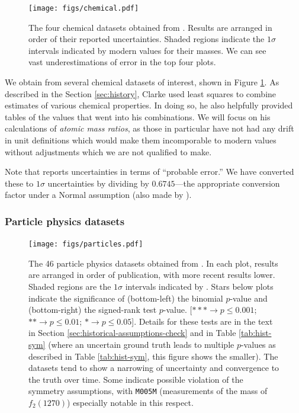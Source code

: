 \documentclass[letterpaper,12pt]{article}
\begin{document}
\begin{figure}[htbp]
  \texttt{[image: figs/chemical.pdf]}
  \caption{The four chemical datasets obtained from \citet{clarke1910recalculation}. Results are arranged in order of their reported uncertainties. Shaded regions indicate the $1\sigma$ intervals indicated by modern values for their masses. We can see vast underestimations of error in the top four plots.}
  \label{fig:chemical}
\end{figure}

We obtain from \citet{clarke1910recalculation} several chemical datasets of interest, shown in Figure \ref{fig:chemical}. As described in the Section \ref{sec:history}, Clarke used least squares to combine estimates of various chemical properties. In doing so, he also helpfully provided tables of the values that went into his combinations. We will focus on his calculations of \textit{atomic mass ratios}, as those in particular have not had any drift in unit definitions which would make them incomporable to modern values without adjustments which we are not qualified to make.

Note that \citet{clarke1910recalculation} reports uncertainties in terms of ``probable error.'' We have converted these to $1\sigma$ uncertainties by dividing by $0.6745$---the appropriate conversion factor under a Normal assumption (also made by \citet{clarke1910recalculation}).

\subsubsection{Particle physics datasets}

\begin{figure}[htbp]
  \texttt{[image: figs/particles.pdf]}
  \caption{The 46 particle physics datasets obtained from \citet{roos1970review}. In each plot, results are arranged in order of publication, with more recent results lower. Shaded regions are the $1\sigma$ intervals indicated by \citet{navas2024review}. Stars below plots indicate the significance of (bottom-left) the binomial $p$-value and (bottom-right) the signed-rank test $p$-value. [$\ast\ast\ast\rightarrow p\leq 0.001$; $\ast\ast\rightarrow p\leq 0.01$; $\ast\rightarrow p\leq0.05$]. Details for these tests are in the text in Section \ref{sec:historical-assumptions-check} and in Table \ref{tab:hist-sym} (where an uncertain ground truth leads to multiple $p$-values as described in Table \ref{tab:hist-sym}, this figure shows the smaller). The datasets tend to show a narrowing of uncertainty and convergence to the truth over time. Some indicate possible violation of the symmetry assumptions, with \texttt{M005M} (measurements of the mass of $f_2(1270)$) especially notable in this respect.}
  \label{fig:particle}
\end{figure}
\end{document}
